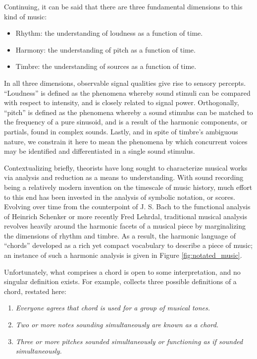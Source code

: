 Continuing, it can be said that there are three fundamental dimensions to this kind of music:

\begin{itemize}
\item Rhythm: the understanding of loudness as a function of time.
\item Harmony: the understanding of pitch as a function of time.
\item Timbre: the understanding of sources as a function of time.
\end{itemize}

In all three dimensions, observable signal qualities give rise to sensory percepts.
``Loudness'' is defined as the phenomena whereby sound stimuli can be compared with respect to intensity, and is closely related to signal power.
Orthogonally, ``pitch'' is defined as the phenomena whereby a sound stimulus can be matched to the frequency of a pure sinusoid, and is a result of the harmonic components, or partials, found in complex sounds.
Lastly, and in spite of timbre's ambiguous nature, we constrain it here to mean the phenomena by which concurrent voices may be identified and differentiated in a single sound stimulus.

Contextualizing briefly, theorists have long sought to characterize musical works via analysis and reduction as a means to understanding.
With sound recording being a relatively modern invention on the timescale of music history, much effort to this end has been invested in the analysis of symbolic notation, or scores.
Evolving over time from the counterpoint of J. S. Bach to the functional analysis of Heinrich Schenker or more recently Fred Lehrdal, traditional musical analysis revolves heavily around the harmonic facets of a musical piece by marginalizing the dimensions of rhythm and timbre.
As a result, the harmonic language of ``chords'' developed as a rich yet compact vocabulary to describe a piece of music; an instance of such a harmonic analysis is given in Figure \ref{fig:notated_music}.

Unfortunately, what comprises a chord is open to some interpretation, and no singular definition exists.
For example, \cite{McVicar2013} collects three possible definitions of a chord, restated here:

\begin{enumerate}
\item \emph{Everyone agrees that \emph{chord} is used for a group of musical tones.}
\item \emph{Two or more notes sounding simultaneously are known as a chord.}
\item \emph{Three or more pitches sounded simultaneously or functioning as if sounded simultaneously.}
\end{enumerate}

